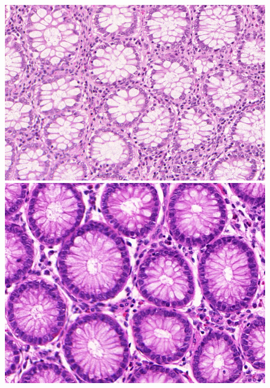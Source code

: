 \begin{figure}[H]
	\centering
	
	\begin{minipage}[b]{0.4\columnwidth}
		\centering
		\includegraphics[clip, width=\linewidth]{fig/chapter2/pretrain_image/testA_5.bmp}
	\end{minipage}
	\hspace{5truemm}
	\begin{minipage}[b]{0.4\columnwidth}
		\centering
		\includegraphics[clip, width=\linewidth]{fig/chapter2/pretrain_image/testA_35.bmp}
	\end{minipage}
	

\end{figure}
